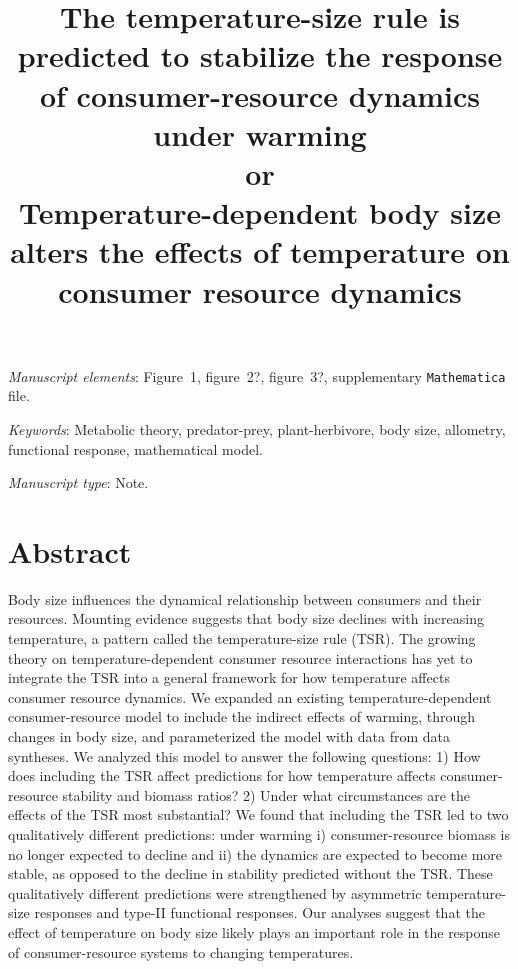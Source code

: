 \documentclass[11pt]{article}
\title{The temperature-size rule is predicted to stabilize the response of consumer-resource dynamics under warming\\
or\\
Temperature-dependent body size alters the effects of temperature on consumer resource dynamics}
\date{}
\begin{document}
\maketitle

%
%

\bigskip

\textit{Manuscript elements}: Figure~1, figure~2?, figure~3?, supplementary \texttt{Mathematica} file.
\bigskip

\textit{Keywords}: Metabolic theory, predator-prey, plant-herbivore, body size, allometry, functional response, mathematical model.

\bigskip

\textit{Manuscript type}: Note. 

\bigskip


\linenumbers{}
\modulolinenumbers[3]

\newpage{}

\section*{Abstract}
Body size influences the dynamical relationship between consumers and their resources. 
Mounting evidence suggests that body size declines with increasing temperature, a pattern called the temperature-size rule (TSR). 
The growing theory on temperature-dependent consumer resource interactions has yet to integrate the TSR into a general framework for how temperature affects consumer resource dynamics. 
We expanded an existing temperature-dependent consumer-resource model to include the indirect effects of warming, through changes in body size, and parameterized the model with data from data syntheses. 
We analyzed this model to answer the following questions: 
1) How does including the TSR affect predictions for how temperature affects consumer-resource stability and biomass ratios? 
2) Under what circumstances are the effects of the TSR most substantial? 
We found that including the TSR led to two qualitatively different predictions: under warming i) consumer-resource biomass is no longer expected to decline and ii) the dynamics are expected to become more stable, as opposed to the decline in stability predicted without the TSR. 
These qualitatively different predictions were strengthened by asymmetric temperature-size responses and type-II functional responses.
Our analyses suggest that the effect of temperature on body size likely plays an important role in the response of consumer-resource systems to changing temperatures. 
\end{document}
